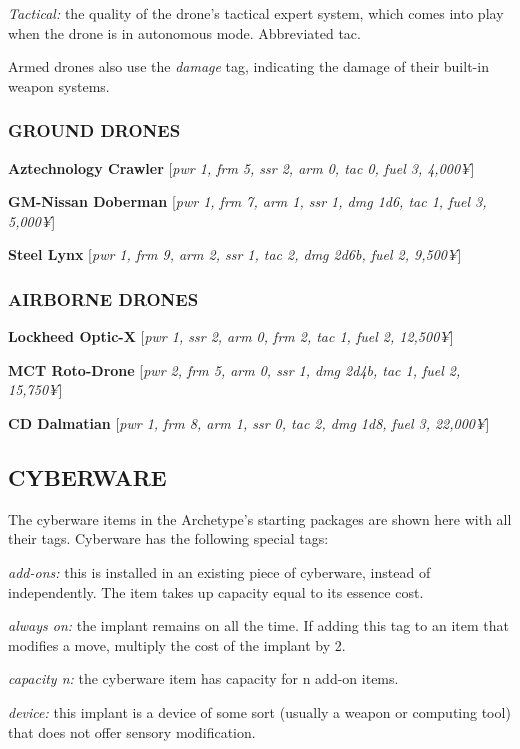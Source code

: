 \documentclass[oneside,10pt]{article}
\begin{document}
\begin{multicols}{2}
\begin{adjustwidth*}{.5cm}{.5cm}
\textit{Tactical:} the quality of the drone’s tactical expert system,
which comes into play when the drone is in autonomous
mode. Abbreviated tac.
\end{adjustwidth*}

Armed drones also use the \textit{damage} tag, indicating the damage of their built-in weapon systems.

\subsubsection{GROUND DRONES}
\textbf{Aztechnology Crawler} [\textit{pwr 1, frm 5, ssr 2, arm 0, tac 0, fuel
3, 4,000¥}]

\textbf{GM-Nissan Doberman} [\textit{pwr 1, frm 7, arm 1, ssr 1, dmg 1d6,
tac 1, fuel 3, 5,000¥}]

\textbf{Steel Lynx} [\textit{pwr 1, frm 9, arm 2, ssr 1, tac 2, dmg 2d6b, fuel
2, 9,500¥}]


\subsubsection{AIRBORNE DRONES}
\textbf{Lockheed Optic-X} [\textit{pwr 1, ssr 2, arm 0, frm 2, tac 1, fuel 2,
12,500¥}]

\textbf{MCT Roto-Drone} [\textit{pwr 2, frm 5, arm 0, ssr 1, dmg 2d4b, tac
1, fuel 2, 15,750¥}]

\textbf{CD Dalmatian} [\textit{pwr 1, frm 8, arm 1, ssr 0, tac 2, dmg 1d8,
fuel 3, 22,000¥}]


\subsection{CYBERWARE}
The cyberware items in the Archetype’s starting packages are
shown here with all their tags. Cyberware has the following
special tags:
\begin{adjustwidth*}{.5cm}{.5cm}

\textit{add-ons:} this is installed in an existing piece of cyberware,
instead of independently. The item takes up capacity equal
to its essence cost.

\textit{always on:} the implant remains on all the time. If adding
this tag to an item that modifies a move, multiply the cost
of the implant by 2.

\textit{capacity n:} the cyberware item has capacity for n add-on
items.

\textit{device:} this implant is a device of some sort (usually a
weapon or computing tool) that does not offer sensory
modification.


\end{adjustwidth*}
\end{multicols}
\end{document}
